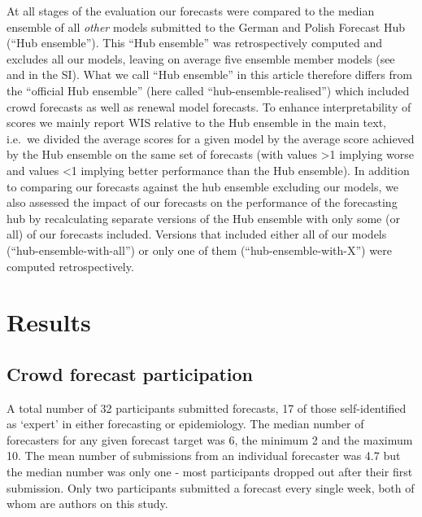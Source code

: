 \documentclass[10pt,letterpaper]{article}
\begin{document}
At all stages of the evaluation our forecasts were compared to the
median ensemble of all \emph{other} models submitted to the German and
Polish Forecast Hub (``Hub ensemble''). This ``Hub ensemble'' was
retrospectively computed and excludes all our models, leaving on average
five ensemble member models (see 
and  in the SI). What we call ``Hub
ensemble'' in this article therefore differs from the ``official Hub
ensemble'' (here called ``hub-ensemble-realised'') which included crowd
forecasts as well as renewal model forecasts. To enhance
interpretability of scores we mainly report WIS relative to the Hub
ensemble in the main text, i.e.~we divided the average scores for a
given model by the average score achieved by the Hub ensemble on the
same set of forecasts (with values \textgreater1 implying worse and
values \textless1 implying better performance than the Hub ensemble). In
addition to comparing our forecasts against the hub ensemble excluding
our models, we also assessed the impact of our forecasts on the
performance of the forecasting hub by recalculating separate versions of
the Hub ensemble with only some (or all) of our forecasts included.
Versions that included either all of our models
(``hub-ensemble-with-all'') or only one of them
(``hub-ensemble-with-X'') were computed retrospectively.

\hypertarget{results}{%
\section{Results}\label{results}}

\hypertarget{crowd-forecast-participation}{%
\subsection{Crowd forecast
participation}\label{crowd-forecast-participation}}

A total number of 32 participants submitted forecasts, 17 of those
self-identified as `expert' in either forecasting or epidemiology. The
median number of forecasters for any given forecast target was 6, the
minimum 2 and the maximum 10. The mean number of submissions from an
individual forecaster was 4.7 but the median number was only one - most
participants dropped out after their first submission. Only two
participants submitted a forecast every single week, both of whom are
authors on this study.
\end{document}
